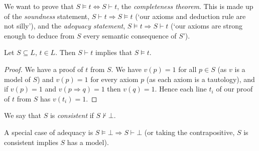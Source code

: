 \documentclass[a3paper, 10pt]{article}
\renewcommand{\vocab}[1]{\emph{#1}}
\begin{document}
\begin{multicols*}{5}
We want to prove that $S \models t \iff S \vdash t$, the \vocab{completeness theorem}.
This is made up of the \vocab{soundness} statement, $S \vdash t \Rightarrow S \models t$ (`our axioms and deduction rule are not silly'), and the \vocab{adequacy statement}, $S \models t \Rightarrow S \vdash t$ (`our axioms are strong enough to deduce from $S$ every semantic consequence of $S$').

\begin{proposition}[Soundness]
  Let $S \subseteq L$, $t \in L$. Then $S \vdash t$ implies that $S \models t$.
\end{proposition}
\begin{proof}
  We have a proof of $t$ from $S$. We have $v(p) = 1$ for all $p \in S$ (as $v$ is a model of $S$) and $v(p) = 1$ for every axiom $p$ (as each axiom is a tautology), and if $v(p) = 1$ and $v(p \Rightarrow q) = 1$ then $v(q) = 1$. Hence each line $t_i$ of our proof of $t$ from $S$ has $v(t_i) =1 $.
\end{proof}




\begin{definition}[Consistent]
  We say that $S$ is \vocab{consistent} if $S \not\vdash \bot$.
\end{definition}

A special case of adequacy is $S \models \bot \Rightarrow S \vdash \bot$ (or taking the contrapositive, $S$ is consistent implies $S$ has a model).


\end{multicols*}
\end{document}

